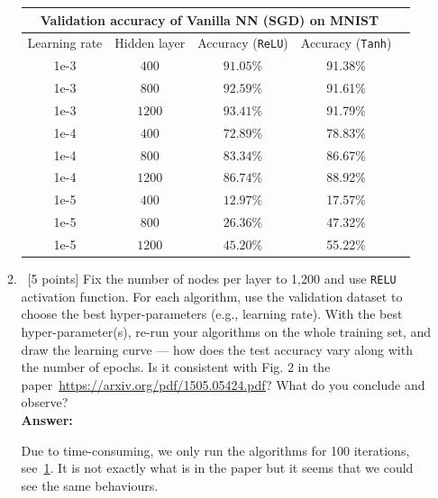 \documentclass[12pt, fullpage,letterpaper]{article}
\def\red{\color{black!30!red}}
\def\blackblue{\color{black!40!blue}}
\begin{document}
\begin{enumerate}
\begin{enumerate}
{		
		\begin{center}
\begin{tabular}{ |c||c|c|c|c|}
 \hline
 \multicolumn{4}{|c|}{Validation accuracy of Vanilla NN (SGD) on MNIST} \\
 \hline
Learning rate & Hidden layer &  Accuracy (\texttt{ReLU}) & Accuracy (\texttt{Tanh})\\
 \hline
 1e-3   & $400$     & $91.05\%$ &   91.38\%\\ 
 \hline
 1e-3   & $800$     & $92.59\%$  &  91.61\%\\
 \hline
 1e-3   & $1200$   & $93.41\%$  &  91.79\%\\
  \hline
 \hline
 1e-4   & $400$      & $72.89\%$& 78.83\%\\  
 \hline
 1e-4   & $800$      & $83.34\%$ &  86.67\%\\
\hline
 1e-4   & $1200$    & $86.74\%$ &  88.92\%\\ 
 \hline
 \hline
 1e-5   & $400$    & $12.97\%$ &  17.57\%\\  
 \hline
 1e-5   & $800$    & $26.36\%$ &  47.32\%\\
\hline
 1e-5   & $1200$    & $45.20\%$ &  55.22\%\\
 \hline
\end{tabular}
\end{center}		
}					
		
		
		
		\item~[5 points] Fix the number of nodes per layer to 1,200 and use \texttt{RELU} activation function. For each algorithm, use the validation dataset to choose the best hyper-parameters (e.g., learning rate). With the best hyper-parameter(s), re-run your algorithms on the whole training set, and draw the learning curve --- how does the test accuracy vary along with the number of epochs. Is it consistent with Fig. 2 in the paper~\url{https://arxiv.org/pdf/1505.05424.pdf}? What do you conclude and observe?\\
{\bf \red Answer: }{\blackblue 
		Due to time-consuming, we only run the algorithms for 100 iterations, see~\ref{Fig10}. It is not exactly what is in the paper but it seems that we could see the same behaviours.
			\begin{figure}[H]
	\begin{center}
	 \end{center}
	 \caption{{\footnotesize }}\label{Fig10}    
	\end{figure}	

		}
	\end{enumerate}
\end{enumerate}
\end{document}
